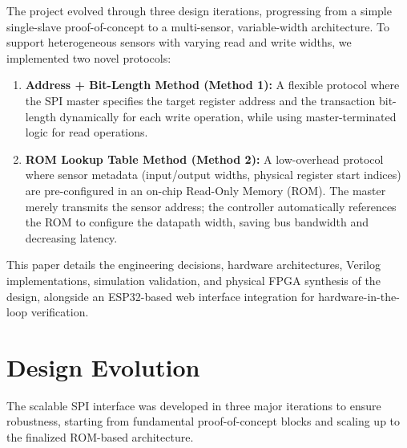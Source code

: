 \documentclass[conference]{IEEEtran}
\begin{document}
The project evolved through three design iterations, progressing from a simple single-slave proof-of-concept to a multi-sensor, variable-width architecture. To support heterogeneous sensors with varying read and write widths, we implemented two novel protocols:
\begin{enumerate}
    \item \textbf{Address + Bit-Length Method (Method 1):} A flexible protocol where the SPI master specifies the target register address and the transaction bit-length dynamically for each write operation, while using master-terminated logic for read operations.
    \item \textbf{ROM Lookup Table Method (Method 2):} A low-overhead protocol where sensor metadata (input/output widths, physical register start indices) are pre-configured in an on-chip Read-Only Memory (ROM). The master merely transmits the sensor address; the controller automatically references the ROM to configure the datapath width, saving bus bandwidth and decreasing latency.
\end{enumerate}

This paper details the engineering decisions, hardware architectures, Verilog implementations, simulation validation, and physical FPGA synthesis of the design, alongside an ESP32-based web interface integration for hardware-in-the-loop verification.

\section{Design Evolution}
The scalable SPI interface was developed in three major iterations to ensure robustness, starting from fundamental proof-of-concept blocks and scaling up to the finalized ROM-based architecture.
\end{document}
